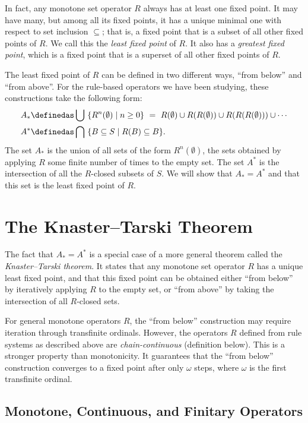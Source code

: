 In fact, any monotone set operator $R$ always has at least one fixed point. It may have many, but among all its fixed points, it has a unique minimal one with respect to set inclusion $\subseteq$; that is, a fixed point that is a subset of all other fixed points of $R$.
We call this the \emph{least fixed point} of $R$.
It also has a \emph{greatest fixed point}, which is a fixed point that is a superset of all other fixed points of $R$.

The least fixed point of $R$ can be defined in two different ways, ``from below'' and ``from above''. For the rule-based operators we have been studying, these constructions take the following form:
\begin{align}
A_* &\definedas \bigcup\ \{R^n(\emptyset) \mid n\geq 0\}\ =\ R(\emptyset) \cup R(R(\emptyset)) \cup R(R(R(\emptyset)))\cup \cdots\label{eqn:KT1}\\
A^* &\definedas \bigcap\ \{B\subseteq S \mid R(B)\subseteq B\}.\label{eqn:KT2}
\end{align}
The set $A_*$ is the union of all sets of the form $R^n(\emptyset)$, the sets obtained by applying $R$ some finite number of times to the empty set.
The set $A^*$ is the intersection of all the $R$-closed subsets of $S$.
We will show that $A_* = A^*$ and that this set is the least fixed point of $R$.

\section{The Knaster--Tarski Theorem}

The fact that $A_* = A^*$ is a special case of a more general theorem called the \emph{Knaster--Tarski theorem}. It states that any monotone set operator $R$ has a unique least fixed point, and that this fixed point can be obtained either ``from below'' by iteratively applying $R$ to the empty set, or ``from above'' by taking the intersection of all $R$-closed sets.

For general monotone operators $R$, the ``from below'' construction may require iteration through transfinite ordinals. However, the operators $R$ defined from rule systems as described above are \emph{chain-continuous} (definition below). This is a stronger property than monotonicity. It guarantees that the ``from below'' construction converges to a fixed point after only $\omega$ steps, where $\omega$ is the first transfinite ordinal.

\subsection{Monotone, Continuous, and Finitary Operators}

